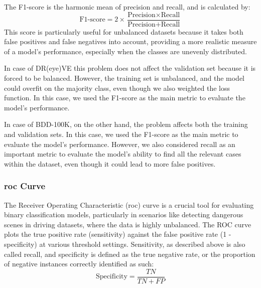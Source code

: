 The F1-score is the harmonic mean of precision and recall, and is calculated by:
\begin{equation*}
    \text{F1-score} = 2 \times \frac{\text{Precision} \times \text{Recall}}{\text{Precision} + \text{Recall}}
\end{equation*}
This score is particularly useful for unbalanced datasets because it takes both 
false positives and false negatives into account, providing a more realistic 
measure of a model’s performance, especially when the classes are unevenly 
distributed.

In case of DR(eye)VE this problem does not affect the validation set because it 
is forced to be balanced. However, the training set is unbalanced, and the model 
could overfit on the majority class, even though we also weighted the loss 
function. In this case, we used the F1-score as the main metric to evaluate the 
model's performance.

In case of BDD-100K, on the other hand, the problem affects both the training 
and validation sets. In this case, we used the F1-score as the main metric to 
evaluate the model's performance. However, we also considered recall as an 
important metric to evaluate the model's ability to find all the relevant cases 
within the dataset, even though it could lead to more false positives.

\subsubsection*{\ac{roc} Curve}
The Receiver Operating Characteristic (\ac{roc}) curve is a crucial tool for 
evaluating binary classification models, particularly in scenarios like detecting 
dangerous scenes in driving datasets, where the data is highly unbalanced. 
The ROC curve plots the true positive rate (sensitivity) against the false positive 
rate (1 - specificity) at various threshold settings. 
Sensitivity, as described above is also called recall, and specificity is 
defined as the true negative rate, or the proportion of negative instances 
correctly identified as such:
\begin{equation*}
    \text{Specificity} = \frac{TN}{TN + FP}
\end{equation*}


